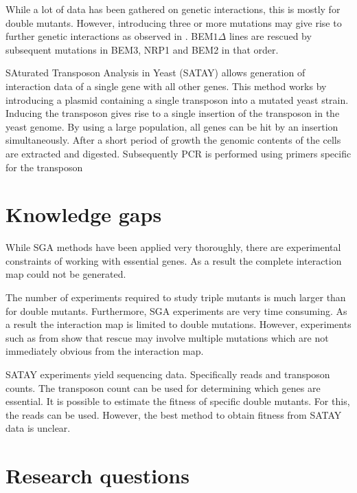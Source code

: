 \documentclass{article}
\begin{document}
While a lot of data has been gathered on genetic interactions, this is mostly for double mutants. However, introducing three or more mutations may give rise to further genetic interactions as observed in \cite{Laan2015}. BEM$1\Delta$ lines are rescued by subsequent mutations in BEM3, NRP1 and BEM2 in that order.

SAturated Transposon Analysis in Yeast (SATAY) allows generation of interaction data of a single gene with all other genes. This method works by introducing a plasmid containing a single transposon into a mutated yeast strain. Inducing the transposon gives rise to a single insertion of the transposon in the yeast genome. By using a large population, all genes can be hit by an insertion simultaneously. After a short period of growth the genomic contents of the cells are extracted and digested. Subsequently PCR is performed using primers specific for the transposon



\section{Knowledge gaps}
While SGA methods have been applied very thoroughly, there are experimental constraints of working with essential genes. As a result the complete interaction map could not be generated. 

The number of experiments required to study triple mutants is much larger than for double mutants. Furthermore, SGA experiments are very time consuming. As a result the interaction map is limited to double mutations. However, experiments such as from \cite{Laan2015} show that rescue may involve multiple mutations which are not immediately obvious from the interaction map. 

SATAY experiments yield sequencing data. Specifically reads and transposon counts. The transposon count can be used for determining which genes are essential. It is possible to estimate the fitness of specific double mutants. For this, the reads can be used. However, the best method to obtain fitness from SATAY data is unclear.



\section{Research questions}
\end{document}
